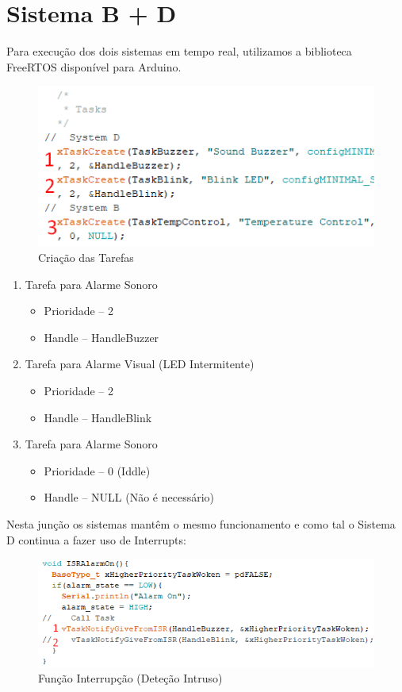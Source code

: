 \newpage\section{Sistema B + D}

Para execução dos dois sistemas em tempo real, utilizamos a biblioteca FreeRTOS disponível para Arduino.

\begin{figure}[H]
    \centering
    \includegraphics[scale=0.9]{images/codigo/sisBD_tasks.png}
    \caption{Criação das Tarefas}
    \label{fig:my_label}
\end{figure}

\begin{enumerate}
    \item Tarefa para Alarme Sonoro
    \begin{itemize}
        \item Prioridade -- 2
        \item Handle -- HandleBuzzer
    \end{itemize}
    \item Tarefa para Alarme Visual (LED Intermitente)
    \begin{itemize}
        \item Prioridade -- 2
        \item Handle -- HandleBlink
    \end{itemize}
    \item Tarefa para Alarme Sonoro
    \begin{itemize}
        \item Prioridade -- 0 (Iddle)
        \item Handle -- NULL (Não é necessário)
    \end{itemize}
\end{enumerate}
\newpage
Nesta junção os sistemas mantêm o mesmo funcionamento e como tal o Sistema D continua a fazer uso de Interrupts:

\begin{figure}[H]
    \centering
    \includegraphics[scale=0.9]{images/codigo/sisBD_on.png}
    \caption{Função Interrupção (Deteção Intruso)}
    \label{fig:my_label}
\end{figure}

